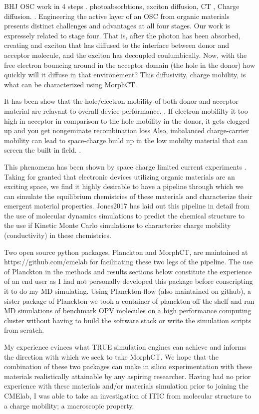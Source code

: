 BHJ OSC work in 4 steps . photoabsorbtions, exciton diffusion, CT , Charge diffusion. \citet{Fusella2019}.
Engineering the active layer of an OSC from organic materials presents distinct challenges and advantages at
all four stages. 
Our work is expressely related to stage four. That is, after the photon has been absorbed, creating and
exciton that has diffused to the interface between donor and acceptor molecule, and the exciton has decoupled
coulumbically. Now, with the free electron bouncing around in the acceptor domain (the hole in the donor) how
quickly will it diffuse in that environement? This diffusivity, charge mobility, is what can be characterized
using MorphCT.

It has been show that the hole/electron mobility of both donor and acceptor material are
relavant to overall device performance. \cite{Wang2019e}. If electron mobililty it too high
in acceptor in comparison to the hole mobility in the donor, it gets clogged up and you get 
nongeminate recombination loss
Also, imbalanced charge-carrier mobility can lead to space-charge build up in the low mobilty material that
can screen the built in field.  \cite{Bartelt2015}. 

This phenomena has been shown by space charge limited current experiments \cite{Small2013}.
Taking for granted that electronic devices utilizing organic materials are an exciting
space, we find it highly desirable to have a pipeline through which we can simulate the equilibrium
chemistries of these materials and characterize their emergent material properties. Jones2017 has laid out this
pipeline in detail from the use of molecular dynamics simulations to predict the chemical structure to the use
if Kinetic Monte Carlo simulations to characterize charge mobility (conductivity) in these chemistries.

Two open source python packages, Planckton and MorphCT, are maintained at https://github.com/cmelab for
facilitating these two legs of the pipeline. The use of Planckton in the methods and results sections below
constitute the experience of an end user as I had not personally developed this package before conscripting it
to do my MD simulating. Using Planckton-flow (also maintained on github), a sister package
of Planckton we took a container of planckton off the shelf and ran MD simulations of benchmark OPV
molecules on a high performance computing cluster without having to build the software stack or write the
simulation scripts from scratch. 

My experience evinces what TRUE simulation engines can achieve and
informs the direction with which we seek to take MorphCT. We hope that the combination of these two packages
can make in silico experimentation with these materials realistically attainable by any aspiring researcher.
Having had no prior experience with these materials and/or materials simulation prior to joining the CMElab,
I was able to take an investigation of ITIC from molecular
structure to a charge mobility; a macroscopic property. 

